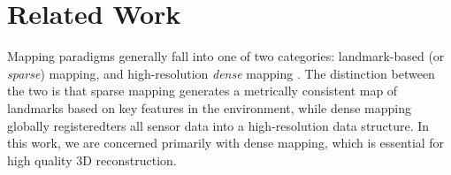\documentclass[10pt,twocolumn,letterpaper]{article}
\newcommand{\ssnote}[1]{{\xxnote{SS}{red}{#1}}}
\newcommand{\xxnote}[3]{}
\renewcommand{\xxnote}[3]{\color{#2}{#1: #3}}
\begin{document}
\section{Related Work}
Mapping paradigms generally fall into one of two categories:
landmark-based (or \emph{sparse}) mapping, and high-resolution \emph{dense}
mapping \ssnote{need cites}. The distinction between the two is that sparse mapping generates a
metrically consistent map of landmarks based on key features in the
environment, while dense mapping globally registeredters all sensor data into a
high-resolution data structure. In this work, we are concerned primarily with
dense mapping, which is essential for high quality 3D reconstruction.
\end{document}
